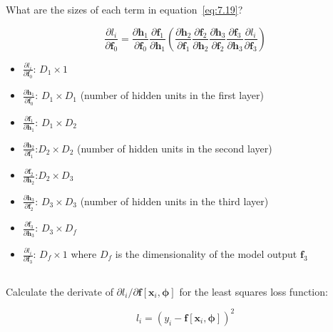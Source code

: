 \documentclass[12pt]{report}
\begin{document}
\subsection{}
\begin{mdframed}
    What are the sizes of each term in equation~\ref{eq:7.19}?

    \begin{equation}
        \frac{\partial l_{i}}{\partial \mathbf{f}_{0}} = \frac{\partial \mathbf{h}_{1}}{\partial \mathbf{f}_{0}}\frac{\partial \mathbf{f}_{1}}{\partial \mathbf{h}_{1}} \left(\frac{\partial \mathbf{h}_{2}}{\partial \mathbf{f}_{1}}\frac{\partial \mathbf{f}_{2}}{\partial \mathbf{h}_{2}}\frac{\partial \mathbf{h}_{3}}{\partial \mathbf{f}_{2}}\frac{\partial \mathbf{f}_{3}}{\partial \mathbf{h}_{3}}\frac{\partial l_{i}}{\partial \mathbf{f}_{3}} \right)
        \tag{7.19}
        \label{eq:7.19}
    \end{equation}
\end{mdframed}

\begin{itemize}
    \item $\frac{\partial l_{i}}{\partial \mathbf{f}_{0}}$: $D_{1} \times 1$
    \item $\frac{\partial \mathbf{h}_{1}}{\partial \mathbf{f}_{0}}$: $D_{1} \times D_{1}$ (number of hidden units in the first layer)
    \item $\frac{\partial \mathbf{f}_{1}}{\partial \mathbf{h}_{1}}$: $D_{1} \times D_{2}$
    \item $\frac{\partial \mathbf{h}_{2}}{\partial \mathbf{f}_{1}}$:$D_{2} \times D_{2}$ (number of hidden units in the second layer)
    \item $\frac{\partial \mathbf{f}_{2}}{\partial \mathbf{h}_{2}}$:$D_{2} \times D_{3}$
    \item $\frac{\partial \mathbf{h}_{3}}{\partial \mathbf{f}_{2}}$: $D_{3} \times D_{3}$ (number of hidden units in the third layer)
    \item $\frac{\partial \mathbf{f}_{3}}{\partial \mathbf{h}_{3}}$: $D_{3} \times D_{f}$
    \item $\frac{\partial l_{i}}{\partial \mathbf{f}_{3}}$: $D_{f} \times 1$ where $D_{f}$ is the dimensionality of the model output $\mathbf{f}_{3}$
\end{itemize}

\subsection{}
\begin{mdframed}
    Calculate the derivate of $\partial l_{i} / \partial \mathbf{f}[\mathbf{x}_{i}, \boldsymbol{\phi}]$ for the least squares loss function:

    \begin{equation*}
        l_{i} = (y_{i} - \mathbf{f}[\mathbf{x}_{i}, \boldsymbol{\phi}])^{2}
    \end{equation*}
\end{mdframed}
\end{document}

